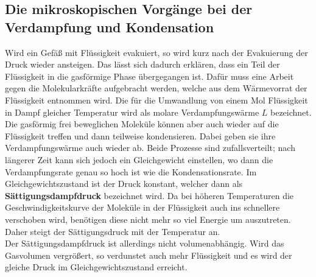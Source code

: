 \subsection{Die mikroskopischen Vorgänge bei der Verdampfung und Kondensation}
\label{sec:Die mikroskopischen Vorgänge bei der Verdampfung und Kondensation}
Wird ein Gefäß mit Flüssigkeit evakuiert, so wird kurz nach der Evakuierung der Druck
wieder ansteigen. Das lässt sich dadurch erklären, dass ein Teil der Flüssigkeit in die
gasförmige Phase übergegangen ist. Dafür muss eine Arbeit gegen die Molekularkräfte aufgebracht
werden, welche aus dem Wärmevorrat der Flüssigkeit entnommen wird. Die für die Umwandlung
von einem Mol Flüssigkeit in Dampf gleicher Temperatur wird als molare Verdampfungswärme
$L$ bezeichnet. Die gasförmig frei beweglichen Moleküle können aber auch wieder auf die
Flüssigkeit treffen und dann teilweise kondensieren. Dabei geben sie ihre
Verdampfungswärme auch wieder ab. Beide Prozesse sind zufallsverteilt; nach längerer Zeit
kann sich jedoch ein Gleichgewicht einstellen, wo dann die Verdampfungsrate genau so hoch
ist wie die Kondensationsrate. Im Gleichgewichtszustand ist der Druck konstant, welcher
dann als \textbf{Sättigungsdampfdruck} bezeichnet wird. Da bei höheren Temperaturen die
Geschwindigkeitskurve der Moleküle in der Flüssigkeit auch ins schnellere verschoben wird,
benötigen diese nicht mehr so viel Energie um auszutreten. Daher steigt der
Sättigungsdruck mit der Temperatur an. 
\\
Der Sättigungsdampfdruck ist allerdings nicht volumenabhängig. Wird das Gasvolumen
vergrößert, so verdunstet auch mehr Flüssigkeit und es wird der gleiche Druck im
Gleichgewichtszustand erreicht.

